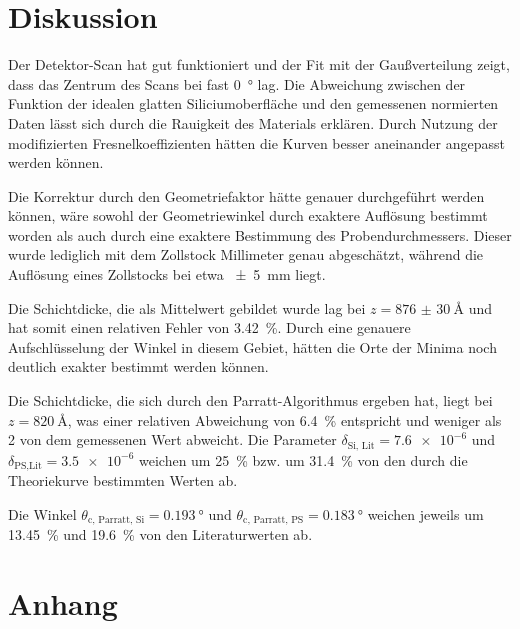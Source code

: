 \section{Diskussion}
\label{sec:Diskussion}

Der Detektor-Scan hat gut funktioniert und der Fit mit der Gaußverteilung zeigt, dass das Zentrum des Scans bei fast \SI{0}{\degree} lag. 
Die Abweichung zwischen der Funktion der idealen glatten Siliciumoberfläche und den gemessenen normierten Daten lässt sich durch die Rauigkeit des Materials erklären. Durch Nutzung der modifizierten Fresnelkoeffizienten hätten die Kurven besser aneinander angepasst werden können. 

Die Korrektur durch den Geometriefaktor hätte genauer durchgeführt werden können, wäre sowohl der Geometriewinkel durch exaktere Auflösung bestimmt worden als auch durch eine exaktere Bestimmung des Probendurchmessers. Dieser wurde lediglich mit dem Zollstock Millimeter genau abgeschätzt, während die Auflösung eines Zollstocks bei etwa \SI{\pm5}{\milli\meter} liegt.

Die Schichtdicke, die als Mittelwert gebildet wurde lag bei $z = \SI{876(30)}{\angstrom}$ und hat somit einen relativen Fehler von \SI{3.42}{\percent}. Durch eine genauere Aufschlüsselung der Winkel in diesem Gebiet, hätten die Orte der Minima noch deutlich exakter bestimmt werden können. 

Die Schichtdicke, die sich durch den Parratt-Algorithmus ergeben hat, liegt bei $z = \SI{820}{\angstrom}$, was einer relativen Abweichung von \SI{6.4}{\percent} entspricht und weniger als \SI{2}{\sigma} von dem gemessenen Wert abweicht.
Die Parameter $\delta_\text{Si, Lit}= \num{7.6e-6}$ und $\delta_\text{PS,Lit}=\num{3.5e-6}$ weichen um \SI{25}{\percent} bzw. um \SI{31.4}{\percent} von den durch die Theoriekurve bestimmten Werten ab. 

Die Winkel $\theta_\text{c, Parratt, Si}= \SI{0.193}{\degree}$ und $\theta_\text{c, Parratt, PS}= \SI{0.183}{\degree}$ weichen jeweils um \SI{13.45}{\percent} und \SI{19.6}{\percent} von den Literaturwerten ab. 

\newpage
\section{Anhang} \label{sec:Anhang}

